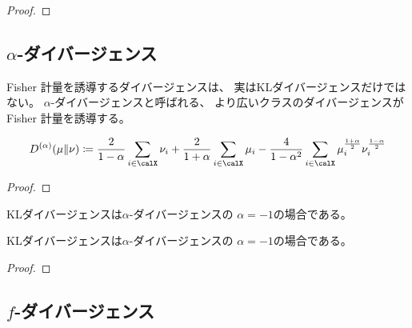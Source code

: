 \documentclass[report]{jlreq}
\begin{document}
\begin{definition}[KLダイバージェンス]
    \TODO{}
\end{definition}

\begin{proposition}
    \TODO{}
\end{proposition}

\begin{proof}
    \TODO{}
\end{proof}

\subsection{$\alpha$-ダイバージェンス}

Fisher 計量を誘導するダイバージェンスは、
実はKLダイバージェンスだけではない。
$\alpha$-ダイバージェンスと呼ばれる、
より広いクラスのダイバージェンスが Fisher 計量を誘導する。

\begin{definition}
    \begin{equation}
        D^{(\alpha)}(\mu \| \nu)
            \coloneqq \frac{2}{1 - \alpha} \sum_{i \in \calX} \nu_i
            + \frac{2}{1 + \alpha} \sum_{i \in \calX} \mu_i
            - \frac{4}{1 - \alpha^2} \sum_{i \in \calX}
                \mu_i^{\frac{1 + \alpha}{2}}
                \nu_i^{\frac{1 - \alpha}{2}}
    \end{equation}
    \TODO{}
\end{definition}

\begin{proposition}
    \TODO{}
\end{proposition}

\begin{proof}
    \TODO{}
\end{proof}

KLダイバージェンスは$\alpha$-ダイバージェンスの
$\alpha = -1$の場合である。

\begin{proposition}
    KLダイバージェンスは$\alpha$-ダイバージェンスの
    $\alpha = -1$の場合である。
\end{proposition}

\begin{proof}
    \TODO{}
\end{proof}

\subsection{$f$-ダイバージェンス}
\end{document}
